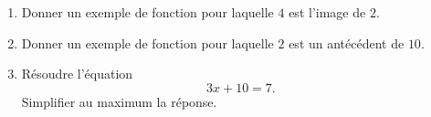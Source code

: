 
\begin{exercice}\label{exosmath-0295}

    \begin{enumerate}
        \item
            Donner un exemple de fonction pour laquelle \( 4\) est l'image de \( 2\).
        \item
            Donner un exemple de fonction pour laquelle \( 2\) est un antécédent de \( 10\).
        \item
            Résoudre l'équation
            \begin{equation}
                3x+10=7.
            \end{equation}
            Simplifier au maximum la réponse.
    \end{enumerate}

\end{exercice}
